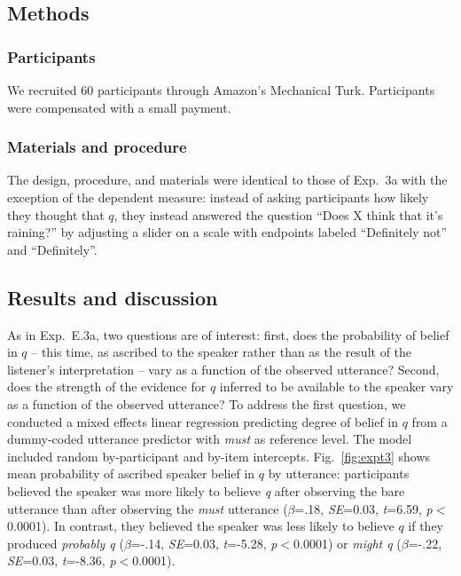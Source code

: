 \documentclass[11pt]{article}
\begin{document}
\subsection{Methods}

\subsubsection{Participants}

We recruited 60 participants through Amazon's Mechanical Turk. Participants were compensated with a small payment.

\subsubsection{Materials and procedure}

The design, procedure, and materials were identical to those of Exp.~3a with the  exception of the dependent measure: instead of asking participants how likely they thought that $q$, they instead answered the question ``Does X think that it's raining?'' by adjusting a slider on a scale with endpoints labeled ``Definitely not'' and ``Definitely''. 

\subsection{Results and discussion}

As in Exp.~E.3a, two questions are of interest: first, does the probability of  belief in $q$ -- this time, as ascribed to the speaker rather than as the result of the listener's interpretation --  vary as a function of the observed utterance? Second, does the strength of the evidence for $q$ inferred to be available to the speaker vary as a function of the observed utterance? To address the first question, we conducted a mixed effects linear regression predicting degree of belief in $q$ from a dummy-coded utterance predictor with \emph{must} as reference level. The model included random by-participant and by-item intercepts. Fig.~\ref{fig:expt3} shows mean probability of ascribed speaker belief in $q$ by utterance: participants believed the speaker was more likely to believe \emph{q}  after observing the bare utterance than after observing the \emph{must} utterance   ($\beta$=.18, \emph{SE}=0.03, \emph{t}=6.59, \emph{p}$<$0.0001). In contrast, they believed the speaker was less likely to believe $q$ if they produced \emph{probably q} ($\beta$=-.14, \emph{SE}=0.03, \emph{t}=-5.28, \emph{p}$<$0.0001) or \emph{might q} ($\beta$=-.22, \emph{SE}=0.03, \emph{t}=-8.36, \emph{p}$<$0.0001). 
\end{document}
